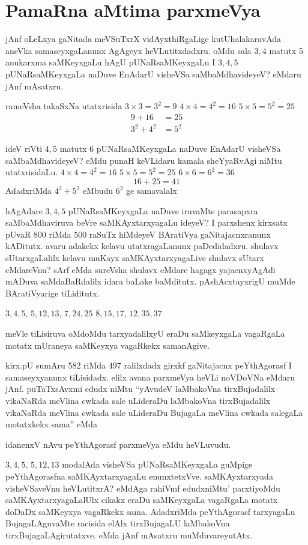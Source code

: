 \chapter{PamaRna aMtima parxmeVya}

jAnf oLeLxya gaNitada meVSuTxrX vidAyxthiRgaLige kutUhalakaravAda aneVka samaseyxgaLanunx AgAgeyx heVLutitxdadxru. oMdu sala $3, 4$ matutx {\rm 5} anukarxma saMKeyxgaLu hAgU pUNaRsaMKeyxgaLu I $3, 4, 5$ pUNaRsaMKeyxgaLa naDuve EnAdarU visheVSa saMbaMdhavideyeV? eMdaru jAnf mAsatxru.

rameVsha takaSxNa utatxrisida \quad $3\times 3=3^2=9$ \quad $4\times 4=4^2=16$ \quad $5\times 5=5^2=25$  
\begin{align*}
9+16 &=25\\
3^2+4^2&=5^2
\end{align*}

ideV riVti $4, 5$ matutx {\rm 6} pUNaRsaMKeyxgaLa naDuve EnAdarU visheVSa saMbaMdhavideyeV? eMdu punaH keVLidaru kamala sheYyaRvAgi niMtu utatxrisidaLu. \quad $4\times 4=4^2=16$ \quad $5\times 5=5^2=25$ \quad $6\times 6=6^2=36$  
$$
16+25 =41
$$
AdadxriMda $4^2+5^2$ eMbudu $6^2$ ge samavalalx

hAgAdare $3, 4, 5$ pUNaRsaMKeyxgaLa naDuve iruvaMte parasapxra saMbaMdhaviruva beVre saMKAyxtarxyagaLu ideyeV? I parxshenx kirxsatx pUvaR $800$ riMda $500$ raSuTx hiMdeyeV BAratiVya gaNitajacnxranunx kADitutx. avaru adakekx kelavu utatxragaLanunx paDedidadxru. shulavx sUtarxgaLalilx kelavu muKayx saMKAyxtarxyagaLive shulavx sUtarx eMdareVnu? sArf eMda sureVsha shulavx eMdare hagagx yajacnxyAgAdi mADuva saMdaBaRdalilx idara baLake baMditutx. pAshAcxtayxrigU muMde BAratiVyarige tiLiditutx.

$3, 4, 5$, \quad $5, 12, 13$, \quad $7, 24, 25$ \quad $8, 15, 17$, \quad $12, 35, 37$

meVle tiLisiruva oMdoMdu tarxyadalilxyU eraDu saMkeyxgaLa vagaRgaLa motatx mUraneya saMKeyxya vagaRkekx samanAgive.

kirx.pU sumAru {\rm 582} riMda {\rm 497} ralilxdadx girxkf gaNitajacnx  peYthAgorasf I samaseyxyanunx tiLisidadx. elilx avana parxmeVya heVLi noVDoVNa eMdaru jAnf. puTaTxsAvxmi edudx niMtu ``yAvudeV laMbakoVna tirxBujadalilx vikaNaRda meVlina cwkada sale uLideraDu laMbakoVna tirxBujadalilx vikaNaRda meVlina cwkada sale uLideraDu BujagaLa meVlina cwkada salegaLa motatxkekx sama'' eMda

idanenxV nAvu peYthAgorasf parxmeVya eMdu heVLuvudu.

 $3, 4, 5$, \quad $5, 12, 13$ modalAda visheVSa pUNaRsaMKeyxgaLa guMpige peYthAgo\-rasfna saMKAyxtarxyagaLu enunxtetxVve. saMKAyxtarxyada visheVSaveVnu heVLutitxrA? eMdAga rahiVmf edudxniMtu' parxtiyoMdu saMKAyxtarxyagaLalUlx cikakx eraDu saMKeyxgaLa vagaRgaLa motatx doDaDx saMKeyxya vagaRkekx sama. AdadxriMda peYthAgorasf tarxyagaLu BujagaLAguvaMte racisida elAlx tirxBujagaLU laMbakoVna tirxBujagaLAgirutatxve. eMda jAnf mAsatxru muMduvareyutAtx.

